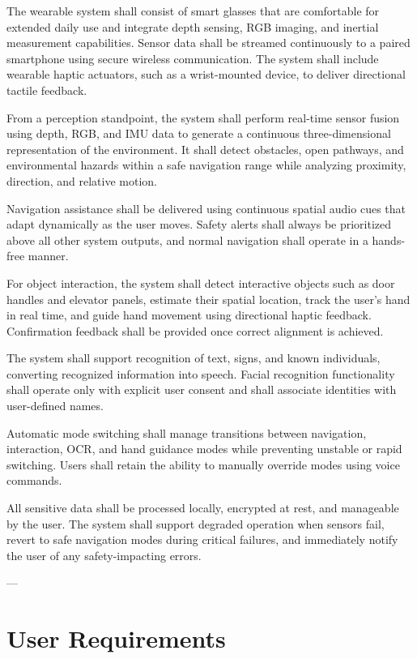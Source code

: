 The wearable system shall consist of smart glasses that are comfortable for extended daily use and integrate depth sensing, RGB imaging, and inertial measurement capabilities. Sensor data shall be streamed continuously to a paired smartphone using secure wireless communication. The system shall include wearable haptic actuators, such as a wrist-mounted device, to deliver directional tactile feedback.

From a perception standpoint, the system shall perform real-time sensor fusion using depth, RGB, and IMU data to generate a continuous three-dimensional representation of the environment. It shall detect obstacles, open pathways, and environmental hazards within a safe navigation range while analyzing proximity, direction, and relative motion.

Navigation assistance shall be delivered using continuous spatial audio cues that adapt dynamically as the user moves. Safety alerts shall always be prioritized above all other system outputs, and normal navigation shall operate in a hands-free manner.

For object interaction, the system shall detect interactive objects such as door handles and elevator panels, estimate their spatial location, track the user’s hand in real time, and guide hand movement using directional haptic feedback. Confirmation feedback shall be provided once correct alignment is achieved.

The system shall support recognition of text, signs, and known individuals, converting recognized information into speech. Facial recognition functionality shall operate only with explicit user consent and shall associate identities with user-defined names.

Automatic mode switching shall manage transitions between navigation, interaction, OCR, and hand guidance modes while preventing unstable or rapid switching. Users shall retain the ability to manually override modes using voice commands.

All sensitive data shall be processed locally, encrypted at rest, and manageable by the user. The system shall support degraded operation when sensors fail, revert to safe navigation modes during critical failures, and immediately notify the user of any safety-impacting errors.

---

\section{User Requirements}

